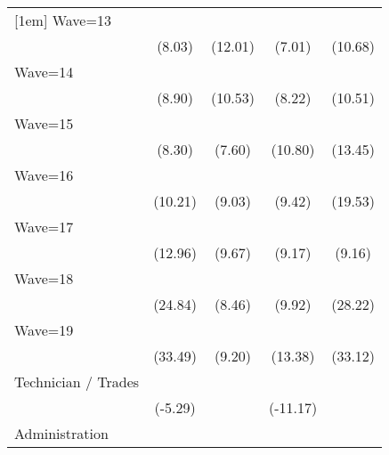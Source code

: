 {\begin{tabular}{l*{4}{c}}
[1em]
Wave=13             &            \sym{***}&            \sym{***}&            \sym{***}&            \sym{***}\\
                    &      (8.03)         &     (12.01)         &      (7.01)         &     (10.68)         \\
[1em]
Wave=14             &            \sym{***}&            \sym{***}&            \sym{***}&            \sym{***}\\
                    &      (8.90)         &     (10.53)         &      (8.22)         &     (10.51)         \\
[1em]
Wave=15             &            \sym{***}&            \sym{***}&            \sym{***}&            \sym{***}\\
                    &      (8.30)         &      (7.60)         &     (10.80)         &     (13.45)         \\
[1em]
Wave=16             &            \sym{***}&            \sym{***}&            \sym{***}&            \sym{***}\\
                    &     (10.21)         &      (9.03)         &      (9.42)         &     (19.53)         \\
[1em]
Wave=17             &            \sym{***}&            \sym{***}&            \sym{***}&            \sym{***}\\
                    &     (12.96)         &      (9.67)         &      (9.17)         &      (9.16)         \\
[1em]
Wave=18             &            \sym{***}&            \sym{***}&            \sym{***}&            \sym{***}\\
                    &     (24.84)         &      (8.46)         &      (9.92)         &     (28.22)         \\
[1em]
Wave=19             &            \sym{***}&            \sym{***}&            \sym{***}&            \sym{***}\\
                    &     (33.49)         &      (9.20)         &     (13.38)         &     (33.12)         \\
[1em]
Technician / Trades &            \sym{***}&                     &            \sym{***}&                     \\
                    &     (-5.29)         &                     &    (-11.17)         &                     \\
[1em]
Administration      &            \sym{***}&                     &            \sym{***}&                     \\

\end{tabular}}
